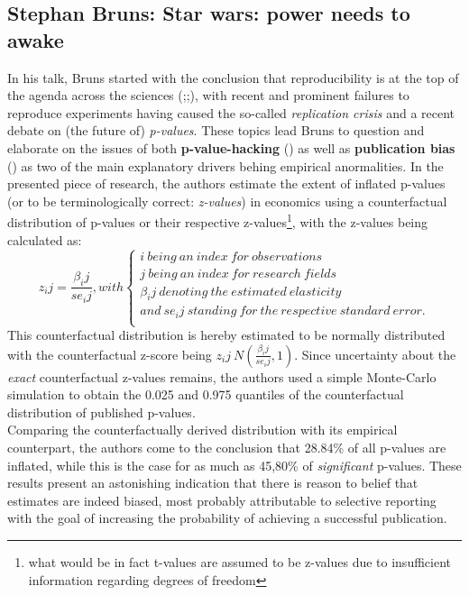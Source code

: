 \documentclass[a4paper,man,natbib]{apa6}
\begin{document}
\subsection{Stephan Bruns: Star wars: power needs to awake}

In his talk, Bruns started with the conclusion that reproducibility is at the top of the agenda across the sciences (\cite{Collaboration2015};\cite{Camerer2016};\cite{Wasserstein2016}), with recent and prominent failures to reproduce experiments having caused the so-called \textit{replication crisis} and a recent debate on (the future of) \textit{p-values}. These topics lead Bruns to question and elaborate on the issues of both \textbf{p-value-hacking} (\cite{Simonsohn2014a}) as well as \textbf{publication bias} (\cite{Rosenthal1979}) as two of the main explanatory drivers behing empirical anormalities. In the presented piece of research, the authors estimate the extent of inflated p-values (or to be terminologically correct: \textit{z-values}) in economics using a counterfactual distribution of p-values or their respective z-values\footnote[6]{what would be in fact t-values are assumed to be z-values due to insufficient information regarding degrees of freedom}, with the z-values being calculated as: 
\begin{equation}
z_ij = \frac{\beta_ij}{se_ij}, with \left\{
\begin{array}{ll}
i \ being\ an\ index\ for\ observations\\
j\ being\ an\ index\ for\ research\ fields\\
\beta_ij\ denoting\ the\ estimated\ elasticity\\
and\ se_ij\ standing\ for\ the\ respective\ standard\ error.\\
\end{array}
\right.
\end{equation}
This counterfactual distribution is hereby estimated to be normally distributed with the counterfactual z-score being $z_ij ~ N(\frac{\beta_ij}{se_ij},1)$. Since uncertainty about the \textit{exact} counterfactual z-values remains, the authors used a simple Monte-Carlo simulation to obtain the 0.025 and 0.975 quantiles of the counterfactual distribution of published p-values.\\
Comparing the counterfactually derived distribution with its empirical counterpart, the authors come to the conclusion that 28.84\% of all p-values are inflated, while this is the case for as much as 45,80\% of \textit{significant} p-values. These results present an astonishing indication that there is reason to belief that estimates are indeed biased, most probably attributable to selective reporting with the goal of increasing the probability of achieving a successful publication. 
\end{document}
